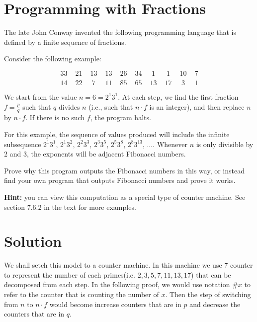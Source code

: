 
\newtheorem{theorem}{Theorem}

\maketitle
\thispagestyle{firststyle}
\vspace{-2.0cm}

\newcommand{\II}{\#2}
\newcommand{\III}{\#3}
\newcommand{\V}{\#5}
\newcommand{\VII}{\#7}
\newcommand{\XI}{\#11}
\newcommand{\XIII}{\#13}
\newcommand{\XVII}{\#17}

\section{Programming with Fractions}
    The late John Conway invented the following programming language that is defined by a finite sequence of fractions.
    
    Consider the following example:
    
    \[
    \frac{33}{14} \quad
    \frac{21}{22} \quad
    \frac{13}{7} \quad
    \frac{13}{11} \quad
    \frac{26}{85} \quad
    \frac{34}{65} \quad
    \frac{1}{13} \quad
    \frac{1}{17} \quad
    \frac{10}{3} \quad
    \frac{7}{1}
    \]
    
    We start from the value $n=6=2^1 3^1$. At each step, we find the first fraction $f=\frac{p}{q}$ such that $q$ divides $n$ (i.e., such that $n \cdot f$ is an integer), and then replace $n$ by $n \cdot f$. If there is no such $f$, the program halts.
    
    For this example, the sequence of values produced will include the infinite subsequence $2^1 3^1$, $2^1 3^2$, $2^2 3^3$, $2^3 3^5$, $2^5 3^8$, $2^8 3^{13}$, $\ldots$.
    Whenever $n$ is only divisible by $2$ and $3$, the exponents will be adjacent Fibonacci numbers.
    
    Prove why this program outputs the Fibonacci numbers in this way, or instead find your own program that outputs Fibonacci numbers and prove it works.
    
    \textbf{Hint:} you can view this computation as a special type of counter machine.
    See section 7.6.2 in the text for more examples.

\section*{Solution}

We shall setch this model to a counter machine. 
In this machine we use 7 counter to represent the number of each primes(i.e. $2, 3, 5, 7, 11, 13, 17$) that can be decomposed from each step.
In the following proof, we would use notation $\#x$ to refer to the counter that is counting the number of $x$.
Then the step of switching from $n$ to $n\cdot f$ would become increase counters that are in $p$ and decrease the counters that are in $q$.

